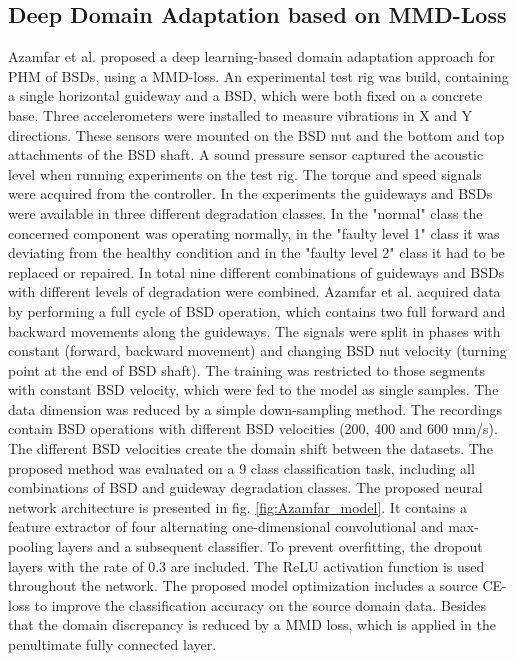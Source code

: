 \subsection{Deep Domain Adaptation based on MMD-Loss}
Azamfar et al. \cite{AZAMFAR2020103932} proposed a deep learning-based domain adaptation approach for PHM of BSDs, using a MMD-loss. An experimental test rig was build, containing a single horizontal guideway and a BSD, which were both fixed on a concrete base. Three accelerometers were installed to measure vibrations in X and Y directions. These sensors were mounted on the BSD nut and the bottom and top attachments of the BSD shaft. A sound pressure sensor captured the acoustic level when running experiments on the test rig. The torque and speed signals were acquired from the controller. In the experiments the guideways and BSDs were available in three different degradation classes. In the "normal" class the concerned component was operating normally, in the "faulty level 1" class it was deviating from the healthy condition and in the "faulty level 2" class it had to be replaced or repaired. In total nine different combinations of guideways and BSDs with different levels of degradation were combined. Azamfar et al. acquired data by performing a full cycle of BSD operation, which contains two full forward and backward movements along the guideways. The signals were split in phases with constant (forward, backward movement) and changing BSD nut velocity (turning point at the end of BSD shaft). The training was restricted to those segments with constant BSD velocity, which were fed to the model as single samples. The data dimension was reduced by a simple down-sampling method. The recordings contain BSD operations with different BSD velocities (200, 400 and 600 mm/s). The different BSD velocities create the domain shift between the datasets. The proposed method was evaluated on a 9 class classification task, including all combinations of BSD and guideway degradation classes. The proposed neural network architecture is presented in fig. \ref{fig:Azamfar_model}. It contains a feature extractor of four alternating one-dimensional convolutional and max-pooling layers and a subsequent classifier. To prevent overfitting, the dropout layers with the rate of 0.3 are included. The ReLU activation function is used throughout the network. The proposed model optimization includes a source CE-loss to improve the classification accuracy on the source domain data. Besides that the domain discrepancy is reduced by a MMD loss, which is applied in the penultimate fully connected layer. 


